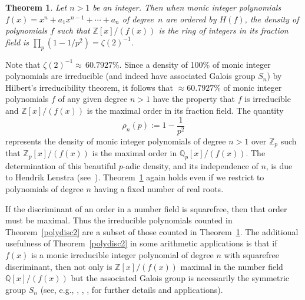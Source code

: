 \documentclass[11pt]{article}
\def\Z{{\mathbb Z}}
\def\Q{{\mathbb Q}}
\def\Z{{\mathbb Z}}
\def\Q{{\mathbb Q}}
\newtheorem{theorem}{Theorem}[section]
\begin{document}
\begin{theorem}\label{polydiscmax2}
  Let $n > 1$ be an integer.  Then when monic integer polynomials
  $f(x)=x^n+a_1x^{n-1}+\cdots+a_n$ of degree~$n$ are ordered by
  $H(f)$, the density of polynomials $f$ such that $\Z[x]/(f(x))$ is
  the ring of integers in its fraction field is
  $\prod_p(1-1/p^2)=\zeta(2)^{-1}$.
\end{theorem}
Note that $\zeta(2)^{-1}\approx\, 60.7927\%$.  Since a density of
100\% of monic integer polynomials are irreducible (and indeed have
associated Galois group $S_n$) by Hilbert's irreducibility theorem, it
follows that $\approx 60.7927\%$ of monic integer polynomials $f$ of
any given degree $n>1$ have the property that $f$ is irreducible and
$\Z[x]/(f(x))$ is the maximal order in its fraction field. The
quantity
\begin{equation}\label{eqrho}
  \rho_n(p):=1-\frac{1}{p^2}
\end{equation}
represents the density of monic integer polynomials
of degree $n>1$ over $\Z_p$ such that $\Z_p[x]/(f(x))$ is the maximal
order in $\Q_p[x]/(f(x))$.  The determination of this beautiful
$p$-adic density, and its independence of $n$, is due to Hendrik
Lenstra (see~\cite[Proposition~3.5]{ABZ}).  Theorem~\ref{polydiscmax2}
again holds even if we restrict to polynomials of degree $n$ having a
fixed number of real roots.

If the discriminant of an order in a number field is squarefree, then
that order must be maximal.  Thus the irreducible polynomials counted
in Theorem~\ref{polydisc2} are a subset of those counted in
Theorem~\ref{polydiscmax2}.  The additional usefulness of
Theorem~\ref{polydisc2} in some arithmetic applications is that if
$f(x)$ is a monic irreducible integer polynomial of degree $n$ with
squarefree discriminant, then not only is $\Z[x]/(f(x))$ maximal in
the number field $\Q[x]/(f(x))$ but the associated Galois group is
necessarily the symmetric group $S_n$ (see, e.g., \cite{Scholz},
\cite{Yamamura}, \cite{Nakagawa}, \cite{Kondo} for further details and
applications).
\end{document}
